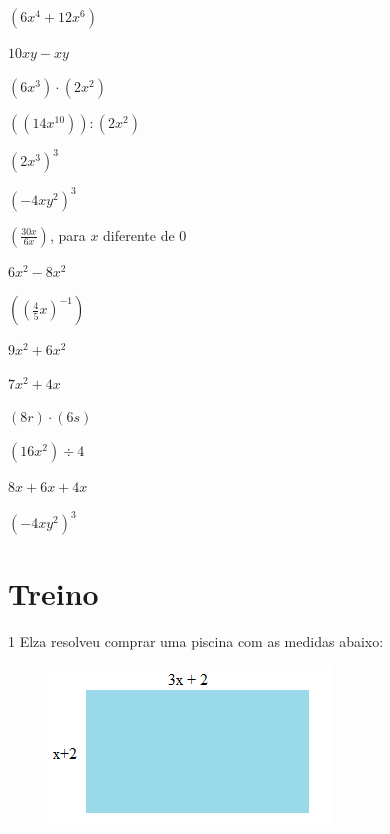 \begin{multicols}{2}
\begin{escolha}[itemsep=0pt]
\item $(6x^4+ 12x^6)$
\item $10xy-xy$
\item $(6x^3) \cdot (2x^2)$
\item $((14x^{10})): (2x^2)$
\item $(2x^3)^3$
\item $(-4xy^2) ^3$
\item $(\frac{30x}{6x})$, para $x$ diferente de $0$
\item $6x^2 - 8x^2$
\item $((\frac{4}{5}x)^{-1})$
\item $9x^2 + 6x^2$
\item $7x^2 + 4x$
\item $(8r) \cdot (6s)$
\item $(16x^2) \div 4$
\item $8x + 6x + 4x$
\item $(-4xy^2)^3$
\end{escolha}
\end{multicols}

\pagebreak

\section{Treino}

\num{1} Elza resolveu comprar uma piscina com as medidas abaixo:

\begin{figure}[H]
\centering\includegraphics[width=2.9625in,height=1.67014in]{./imgSAEB_8_MAT/media/image6.png}
\end{figure}

